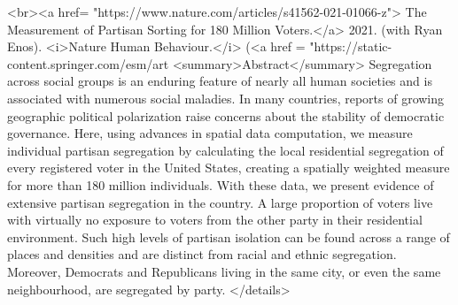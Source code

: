 <br><a href= "https://www.nature.com/articles/s41562-021-01066-z"> The Measurement of Partisan Sorting for 180 Million Voters.</a> 2021. (with Ryan Enos). <i>Nature Human Behaviour.</i>  (<a href = "https://static-content.springer.com/esm/art%
        <summary>Abstract</summary>
    Segregation across social groups is an enduring feature of nearly all human societies and is associated with numerous social maladies. In many countries, reports of growing geographic political polarization raise concerns about the stability of democratic governance. Here, using advances in spatial data computation, we measure individual partisan segregation by calculating the local residential segregation of every registered voter in the United States, creating a spatially weighted measure for more than 180 million individuals. With these data, we present evidence of extensive partisan segregation in the country. A large proportion of voters live with virtually no exposure to voters from the other party in their residential environment. Such high levels of partisan isolation can be found across a range of places and densities and are distinct from racial and ethnic segregation. Moreover, Democrats and Republicans living in the same city, or even the same neighbourhood, are segregated by party.
      </details>

